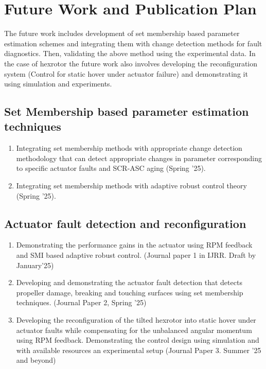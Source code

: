 \section{Future Work and Publication Plan}
The future work includes development of set membership based parameter estimation schemes and integrating them with change detection methods for fault diagnostics. Then, validating the above method using the experimental data. In the case of hexrotor the future work also involves developing the reconfiguration system (Control for static hover under actuator failure) and demonstrating it using simulation and experiments.

\subsection{Set Membership based parameter estimation techniques}
\begin{enumerate}
        \item Integrating set membership methods with appropriate change detection methodology that can detect appropriate changes in parameter corresponding to specific actuator faults and SCR-ASC aging (Spring '25).
        \item Integrating set membership methods with adaptive robust control theory (Spring '25).
\end{enumerate}

\subsection{Actuator fault detection and reconfiguration}
\begin{enumerate}
        \item Demonstrating the performance gains in the actuator using RPM feedback and SMI based adaptive robust control. (Journal paper 1 in IJRR. Draft by January'25)
        \item Developing and demonstrating the actuator fault detection that detects propeller damage, breaking and touching surfaces using set membership techniques. (Journal Paper 2, Spring '25)
        \item Developing the reconfiguration of the tilted hexrotor into static hover under actuator faults while compensating for the unbalanced angular momentum using RPM feedback. Demonstrating the control design using simulation and with available resources an experimental setup (Journal Paper 3. Summer '25 and beyond)
\end{enumerate}

